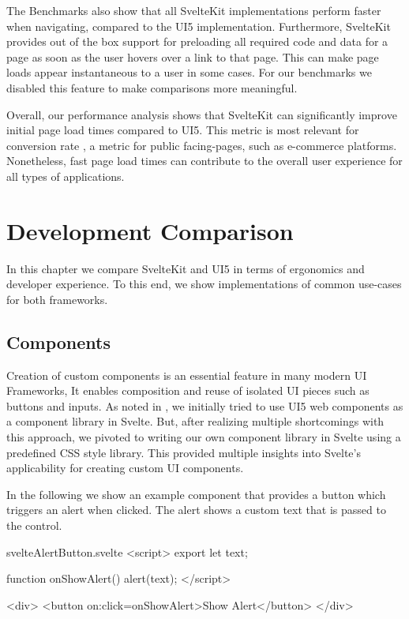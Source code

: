 The Benchmarks also show that all SvelteKit implementations perform faster when navigating, compared to the UI5 implementation. Furthermore, SvelteKit provides out of the box support for preloading all required code and data for a page as soon as the user hovers over a link to that page. This can make page loads appear instantaneous to a user in some cases. For our benchmarks we disabled this feature to make comparisons more meaningful.

Overall, our performance analysis shows that SvelteKit can significantly improve initial page load times compared to UI5. This metric is most relevant for conversion rate \cite{noauthor_load_nodate}, a metric for public facing-pages, such as e-commerce platforms. Nonetheless, fast page load times can contribute to the overall user experience for all types of applications. 

\section{Development Comparison}
In this chapter we compare SvelteKit and UI5 in terms of ergonomics and developer experience. To this end, we show implementations of common use-cases for both frameworks.

\subsection{Components}
Creation of custom components is an essential feature in many modern UI Frameworks, It enables composition and reuse of isolated UI pieces such as buttons and inputs. As noted in , we initially tried to use UI5 web components as a component library in Svelte. But, after realizing multiple shortcomings with this approach, we pivoted to writing our own component library in Svelte using a predefined CSS style library. This provided multiple insights into Svelte's applicability for creating custom UI components.

In the following we show an example component that provides a button which triggers an alert when clicked. The alert shows a custom text that is passed to the control.
 
\begin{listing}[h!]
\begin{myminted}{svelte}{AlertButton.svelte}
<script>
  export let text;

    function onShowAlert() {
        alert(text);
    }
</script>

<div>
  <button on:click={onShowAlert}>Show Alert</button>
</div>
\end{myminted}
\caption{Custom component in Svelte.}
\label{fig:evulation-component-syntax}
\end{listing}

